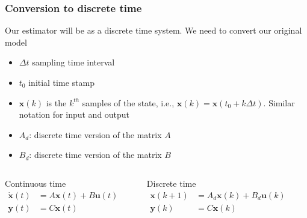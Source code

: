 \begin{frame} 
    \frametitle{Conversion to discrete time}
    Our estimator will be as a discrete time system. We need to convert our original model 
    
    \begin{itemize}
        \item $\Delta t$  sampling time interval
        \item $t_0$ initial time stamp
        \item ${\bm{x}}(k)$ is the $k^{th}$ samples of the state, i.e., $\bm{x}(k)=\bm{x}(t_0+k\Delta t)$. Similar notation for input and output
        \item $A_d$: discrete time version of the matrix $A$
        \item $B_d$: discrete time version of the matrix $B$
    \end{itemize}
     
    \begin{columns}%
        \begin{block}{Continuous time}
            \vspace*{-1em}
            \begin{align*}
            \dot{\bm{x}}(t) &= A \bm{x}(t) + B \bm{u}(t)\\
            \bm{y}(t) &= C \bm{x}(t) 
            \end{align*}
        \end{block}    
        \begin{center}
        \end{center}
        \begin{block}{Discrete time}
            \vspace*{-1em}
            \begin{align*}
            \bm{x}(k+1) &= A_d \bm{x}(k) + B_d \bm{u}(k)\\
            \bm{y}(k) &= C \bm{x}(k) 
            \end{align*}
        \end{block}
    \end{columns}
\end{frame}

